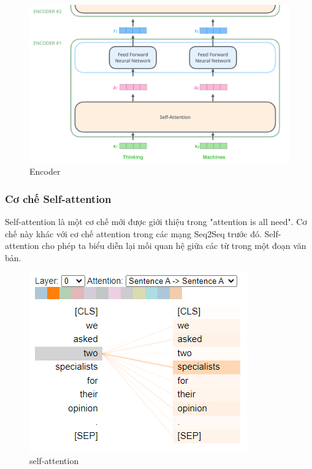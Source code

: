 \begin{figure}[H]
    \begin{center}
        \includegraphics[scale=0.35]{images/encoder}
        \caption{Encoder}
        \label{fig:encoder}
    \end{center}
\end{figure}


\subsubsection{Cơ chế Self-attention}

Self-attention là một cơ chế mới được giới thiệu trong "attention is all need". Cơ chế này khác với cơ chế attention trong các mạng Seq2Seq trước đó. Self-attention cho phép ta biểu diễn lại mối quan hệ giữa các từ trong một đoạn văn bản.

\begin{figure}[H]
    \begin{center}
        \includegraphics[scale=1.0]{images/self-attention}
        \caption{self-attention}
        \label{fig:self-attention}
    \end{center}
\end{figure}

